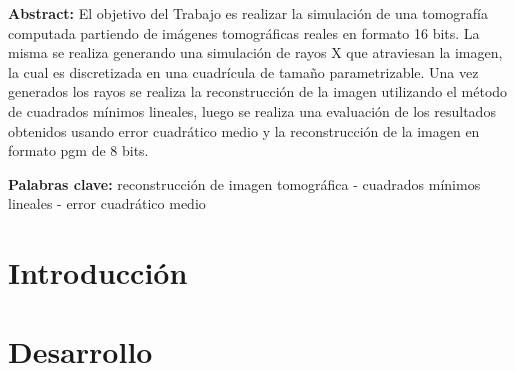 \documentclass[10pt,a4paper]{article}
\begin{document}


\fecha{\today}



\maketitle
\par \textbf{Abstract:} El objetivo del Trabajo es realizar la simulación de una tomografía computada partiendo de imágenes tomográficas reales en formato 16 bits. La misma se realiza generando una simulación de rayos X que atraviesan la imagen, la cual es discretizada en una cuadrícula de tamaño parametrizable. Una vez generados los rayos se realiza la reconstrucción de la imagen utilizando el método de cuadrados mínimos lineales, luego se realiza una evaluación de los resultados obtenidos usando error cuadrático medio y la reconstrucción de la imagen en formato pgm de 8 bits.

\par  \textbf{Palabras clave:} reconstrucción de imagen tomográfica - cuadrados mínimos lineales - error cuadrático medio
\tableofcontents


\newpage

\section{Introducción}

\newpage


\section{Desarrollo}

\newpage
\end{document}

